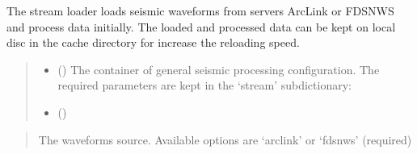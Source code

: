 \documentclass[letterpaper,10pt,english]{sphinxmanual}
\begin{document}
\begin{fulllineitems}
\label{\detokenize{api_core:core.signal_utils.SignalException}}
\pysigstartsignatures
{}
\pysigstopsignatures
\end{fulllineitems}


\begin{fulllineitems}
\label{\detokenize{api_core:core.signal_utils.StreamLoader}}
\pysigstartsignatures
{}
\pysigstopsignatures
\sphinxAtStartPar
The stream loader loads seismic waveforms from servers ArcLink or FDSNWS
and process data initially. The loaded and processed data can be kept on local disc
in the cache directory for increase the reloading speed.
\begin{quote}\begin{description}
\begin{itemize}
\item {} 
\sphinxAtStartPar
{} () \textendash{} The container of general seismic processing configuration.
The required parameters are kept in the ‘stream’ sub\sphinxhyphen{}dictionary:

\item {} 
\sphinxAtStartPar
{} ({\hyperref[\detokenize{api_core:core.signal_utils.StreamPreprocessing}]{}})

\end{itemize}

\end{description}\end{quote}

\sphinxAtStartPar
{}
\begin{quote}\begin{description}
\sphinxAtStartPar
The waveforms source. Available options are ‘arclink’ or ‘fdsnws’ (required)


\end{description}
\end{quote}
\end{fulllineitems}
\end{document}
